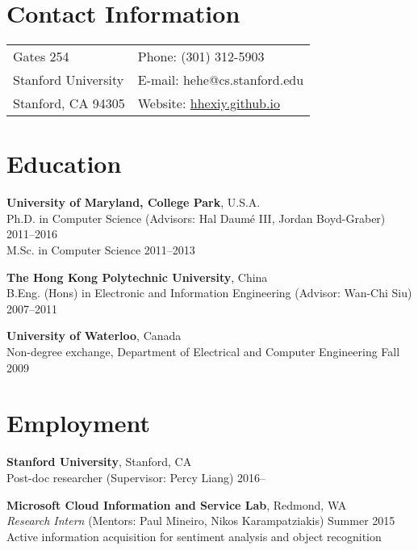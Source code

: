 \documentclass[margin,line]{resume}
\begin{document}

\begin{resume}
\section{\sc Contact Information}
\vspace{.05in}
\begin{tabular}{@{}p{2.5in}p{4in}}
Gates 254             & Phone: (301) 312-5903 \\            
Stanford University   & E-mail: hehe@cs.stanford.edu \\         
Stanford, CA 94305    & Website: \url{hhexiy.github.io}\\        
\end{tabular}


\section{\sc Education}
{\bf University of Maryland, College Park}, U.S.A.\\
Ph.D. in Computer Science (Advisors: Hal Daum\'e III, Jordan Boyd-Graber) \hfill 2011--2016\\
M.Sc. in Computer Science \hfill 2011--2013

{\bf The Hong Kong Polytechnic University}, China\\ 
B.Eng. (Hons) in Electronic and Information Engineering (Advisor: Wan-Chi Siu) \hfill 2007--2011

{\bf University of Waterloo}, Canada\\
Non-degree exchange, Department of Electrical and Computer Engineering \hfill Fall 2009

\section{\sc Employment}
{\bf Stanford University}, Stanford, CA\\
Post-doc researcher (Supervisor: Percy Liang) \hfill 2016--

{\bf Microsoft Cloud Information and Service Lab}, Redmond, WA\\
\emph{Research Intern} (Mentors: Paul Mineiro, Nikos Karampatziakis) \hfill Summer 2015\\
Active information acquisition for sentiment analysis and object recognition 


\end{resume}
\end{document}
